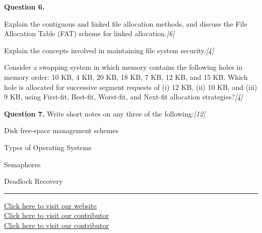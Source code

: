 \documentclass[11pt,a4paper]{article}
\newcommand{\pts}[1]{\hfill   \textit{[#1]}}
\begin{document}
\medskip


\noindent   \textbf{Question 6.}

\begin{parts}
  \item Explain the contiguous and linked file allocation methods, and discuss the File Allocation Table (FAT) scheme for linked allocation.\pts{6}
  \item Explain the concepts involved in maintaining file system security.\pts{4}
  \item Consider a swapping system in which memory contains the following holes in memory order: 10 KB, 4 KB, 20 KB, 18 KB, 7 KB, 12 KB, and 15 KB. Which hole is allocated for successive segment requests of (i) 12 KB, (ii) 10 KB, and (iii) 9 KB, using First-fit, Best-fit, Worst-fit, and Next-fit allocation strategies?\pts{4}
\end{parts}

\medskip


\noindent   \textbf{Question 7.} Write short notes on any three of the following:\pts{12}

\begin{parts}
  \item Disk free-space management schemes
  \item Types of Operating Systems
  \item Semaphores
  \item Deadlock Recovery
\end{parts}

\vfill
\rule{\linewidth}{0.4pt}

\begin{center}\small
\href{https://bhu-exam.vercel.app/}{Click here to visit our website}\\[4pt]\href{https://me-aryan.vercel.app/}{Click here to visit our contributor}\\[4pt]\href{https://quashan-me.vercel.app/}{Click here to visit our contributor}
\end{center}
\end{document}
